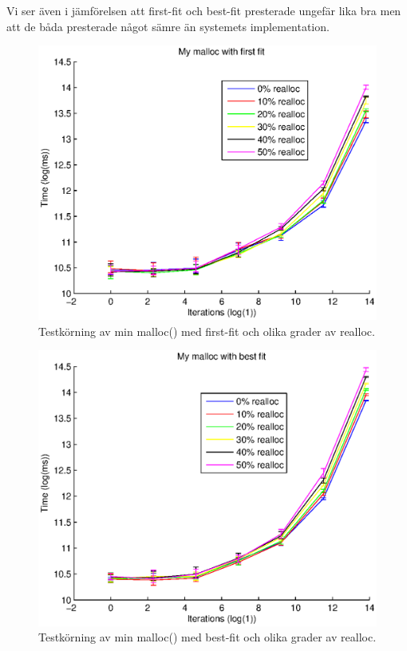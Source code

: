 \documentclass[10pt,a4paper]{article}
\begin{document}
Vi ser även i jämförelsen att first-fit och best-fit presterade ungefär lika bra men att de båda presterade något sämre än systemets implementation.

\clearpage

\begin{figure}
\includegraphics[scale=0.7]{../results/my1.eps}
\caption{Testkörning av min malloc() med first-fit och olika grader av realloc.}
\label{fig:digraph}
\end{figure}

\begin{figure}
\includegraphics[scale=0.7]{../results/my2.eps}
\caption{Testkörning av min malloc() med best-fit och olika grader av realloc.}
\label{fig:digraph}
\end{figure}
\end{document}
